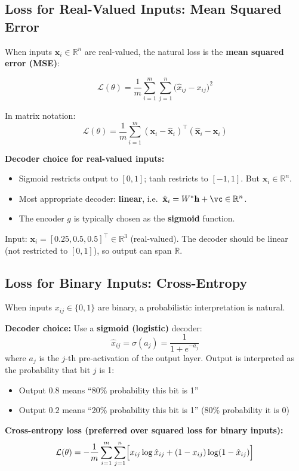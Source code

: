 \documentclass[12pt,a4paper]{article}
\newcommand{\R}{\mathbb{R}}
\newcommand{\vx}{\mathbf{x}}
\newcommand{\vh}{\mathbf{h}}
\newcommand{\hatx}{\hat{\mathbf{x}}}
\newcommand{\Loss}{\mathcal{L}}
\begin{document}
\subsection{Loss for Real-Valued Inputs: Mean Squared Error}

When inputs $\vx_i \in \R^n$ are real-valued, the natural loss is the \textbf{mean squared error (MSE)}:

\[
\Loss(\theta) = \frac{1}{m}\sum_{i=1}^{m}\sum_{j=1}^{n}
  \bigl(\hat{x}_{ij} - x_{ij}\bigr)^2
\]

In matrix notation:
\[
\Loss(\theta) = \frac{1}{m}\sum_{i=1}^{m}
  (\vx_i - \hatx_i)^\top(\hatx_i - \vx_i)
\]

\textbf{Decoder choice for real-valued inputs:}
\begin{itemize}
  \item Sigmoid restricts output to $[0,1]$; tanh restricts to $[-1,1]$. But $\vx_i \in \R^n$.
  \item Most appropriate decoder: \textbf{linear}, i.e.\ $\hatx_i = W^*\vh + \vc \in \R^n$.
  \item The encoder $g$ is typically chosen as the \textbf{sigmoid} function.
\end{itemize}

\begin{exbox}
Input: $\vx_i = [0.25, 0.5, 0.5]^\top \in \R^3$ (real-valued). The decoder should be linear (not restricted to $[0,1]$), so output can span $\R$.
\end{exbox}

\subsection{Loss for Binary Inputs: Cross-Entropy}

When inputs $x_{ij} \in \{0,1\}$ are binary, a probabilistic interpretation is natural.

\textbf{Decoder choice:} Use a \textbf{sigmoid (logistic)} decoder:
\[
\hat{x}_{ij} = \sigma(a_j) = \frac{1}{1+e^{-a_j}}
\]
where $a_j$ is the $j$-th pre-activation of the output layer. Output is interpreted as the probability that bit $j$ is 1:
\begin{itemize}
  \item Output $0.8$ means ``80\% probability this bit is 1''
  \item Output $0.2$ means ``20\% probability this bit is 1'' (80\% probability it is 0)
\end{itemize}

\textbf{Cross-entropy loss (preferred over squared loss for binary inputs):}
\[
\Loss(\theta) = -\frac{1}{m}\sum_{i=1}^{m}\sum_{j=1}^{n}
  \Bigl[x_{ij}\log\hat{x}_{ij} + (1-x_{ij})\log(1-\hat{x}_{ij})\Bigr]
\]
\end{document}
